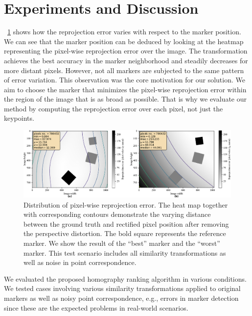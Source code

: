 \section{Experiments and Discussion}
\label{sec:HomographyExperiments}

\figstr{}~\ref{fig:HeatmapsBestWorst} shows how the reprojection error varies with respect to the marker position. We can see that the marker position can be deduced by looking at the heatmap representing the pixel-wise reprojection error over the image. The transformation achieves the best accuracy in the marker neighborhood and steadily decreases for more distant pixels. However, not all markers are subjected to the same pattern of error variation. This observation was the core motivation for our solution. We aim to choose the marker that minimizes the pixel-wise reprojection error within the region of the image that is as broad as possible. That is why we evaluate our method by computing the reprojection error over each pixel, not just the keypoints.

\begin{figure}[t]
    \centerline{\includegraphics[width=\linewidth]{figures/homography/heatmaps_best_worst.pdf}}
    \caption[Homography ranking heatmaps]{Distribution of pixel-wise reprojection error. The heat map together with corresponding contours demonstrate the varying distance between the ground truth and rectified pixel position after removing the perspective distortion. The bold square represents the reference marker. We show the result of  the ``best'' marker and  the ``worst'' marker. This test scenario includes all similarity transformations as well as noise in point correspondence.}
    \label{fig:HeatmapsBestWorst}
\end{figure}

We evaluated the proposed homography ranking algorithm in various conditions. We tested cases involving various similarity transformations applied to original markers as well as noisy point correspondence, e.g., errors in marker detection since these are the expected problems in real-world scenarios.

